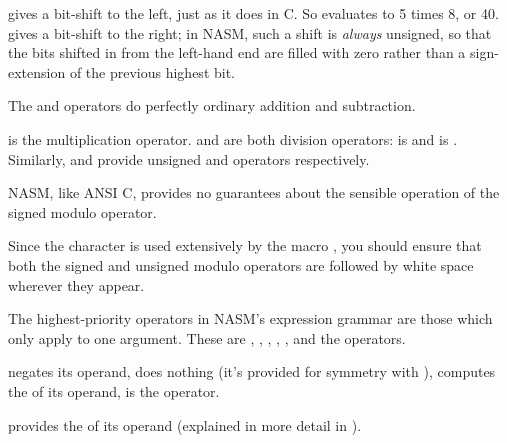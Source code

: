 
\code{<<} gives a bit-shift to the left, just as it does in C.
So  evaluates to 5 times 8, or 40. \code{>>} gives
a bit-shift to the right; in NASM, such a shift is \emph{always}
unsigned, so that the bits shifted in from the left-hand end
are filled with zero rather than a sign-extension of the
previous highest bit.


The \code{+} and \code{-} operators do perfectly ordinary addition
and subtraction.


\code{*} is the multiplication operator. \code{/} and \code{//} are both
division operators: \code{/} is  and
\code{//} is . Similarly, \code{\%} and
\code{\%\%} provide unsigned
and  operators respectively.

NASM, like ANSI C, provides no guarantees about the sensible
operation of the signed modulo operator.

Since the \code{\%} character is used extensively by the macro
, you should ensure that both the signed
and unsigned modulo operators are followed by white space wherever
they appear.


The highest-priority operators in NASM's expression grammar are those
which only apply to one argument. These are \codeindex{+},
\codeindex{-}, \codeindex{\textasciitilde}, \codeindex{!},
, and the  operators.

\code{-} negates its operand, \code{+} does nothing (it's provided for
symmetry with \code{-}), \code{\textasciitilde} computes the
 of its operand, \code{!} is the
 operator.

 provides the 
of its operand (explained in more detail in ).

